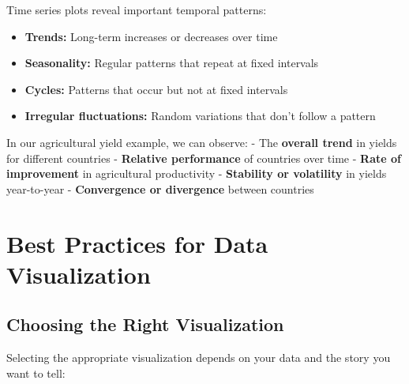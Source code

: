 \documentclass[
  letterpaper,
]{book}
\providecommand{\tightlist}{%
  \setlength{\itemsep}{0pt}\setlength{\parskip}{0pt}}
\begin{document}
Time series plots reveal important temporal patterns:

\begin{itemize}
\tightlist
\item
  \textbf{Trends:} Long-term increases or decreases over time
\item
  \textbf{Seasonality:} Regular patterns that repeat at fixed intervals
\item
  \textbf{Cycles:} Patterns that occur but not at fixed intervals
\item
  \textbf{Irregular fluctuations:} Random variations that don't follow a
  pattern
\end{itemize}

In our agricultural yield example, we can observe: - The \textbf{overall
trend} in yields for different countries - \textbf{Relative performance}
of countries over time - \textbf{Rate of improvement} in agricultural
productivity - \textbf{Stability or volatility} in yields year-to-year -
\textbf{Convergence or divergence} between countries

\section{Best Practices for Data
Visualization}\label{best-practices-for-data-visualization}

\subsection{Choosing the Right
Visualization}\label{choosing-the-right-visualization}

Selecting the appropriate visualization depends on your data and the
story you want to tell:
\end{document}
